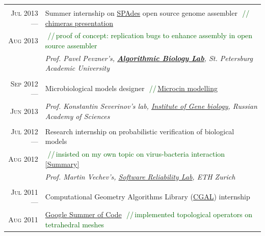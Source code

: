 \documentclass[a4paper,10pt]{article}
\def\myline{\color{linegray}\vline}
\newcommand{\minorcolor}[1]{\textcolor{mygray}{#1}}
\newcommand{\comment}[1]{\small\textcolor{darkgreen}{\,\,//\,#1}}
\newcommand{\mydate}[1]{\minorcolor{\textsc{#1}}}
\begin{document}
{{\begin{tabular}{r!{\myline}p{14cm}}
        \\
        \mydate{Jul 2013 ---}       &   Summer internship on \href{http://bioinf.spbau.ru/spades}{SPAdes} open source genome assembler
                                        \comment{\href{http://pesho.info/wp-content/uploads/chimeras-final.pdf}{chimeras presentation}}\\
        \mydate{Aug 2013}           &   \comment{proof of concept: replication bugs to enhance assembly in open source assembler}\\
                                    &   \textit{Prof. Pavel Pevzner's, \href{http://bioinf.spbau.ru/}{\textbf{Algorithmic Biology Lab}}, St. Petersburg Academic University}\\

        \\
        \mydate{Sep 2012 ---}       &   Microbiological models designer
                                        \comment{\href{https://docs.google.com/document/d/1tNkXLaWY3ooA4MEnrbrL2_DOpOaiTlLoFblwzKFZdy0/edit?usp=sharing}{Microcin modelling}}\\
        \mydate{Jun 2013}           &   \textit{Prof. Konstantin Severinov's lab, \href{http://www.genebiology.ru/}{Institute of Gene biology}, Russian Academy of Sciences}\\

        \\
        \mydate{Jul 2012 ---}       &   Research internship on probabilistic verification of biological models\\
        \mydate{Aug 2012}           &   \comment{insisted on my own topic on virus-bacteria interaction \href{https://docs.google.com/document/d/1tNkXLaWY3ooA4MEnrbrL2_DOpOaiTlLoFblwzKFZdy0/edit?usp=sharing}{[Summary]}}\\
                                    &   \textit{Prof. Martin Vechev's, \href{http://www.srl.inf.ethz.ch/}{Software Reliability Lab}, ETH Zurich}\\

        \\
        \mydate{Jul 2011 ---}       &   Computational Geometry Algorithms Library (\href{http://www.cgal.org/}{CGAL}) internship\\
        \mydate{Aug 2011}           &   \href{http://code.google.com/soc/}{Google Summer of Code}
                                        \comment{implemented topological operators on tetrahedral meshes}\\


\end{tabular}}}
\end{document}
